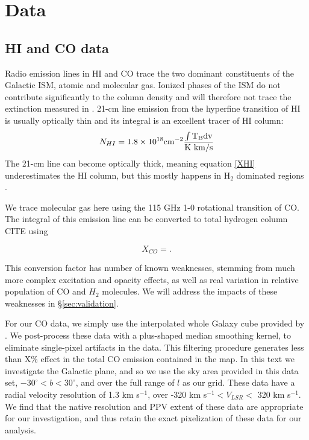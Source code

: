 \section{Data}
\label{sec:data}
\subsection{HI and CO data}

Radio emission lines in HI and CO trace the two dominant constituents of the Galactic ISM, atomic and molecular gas. Ionized phases of the ISM do not contribute significantly to the column density and will therefore not trace the extinction measured in \cite{Green_2015}. 21-cm line emission from the hyperfine transition of HI is usually optically thin and its integral is an excellent tracer of HI column:
\begin{equation}\label{XHI}
N_{HI} = 1.8 \times 10^{18} \rm cm^{-2} \frac{ \int T_B dv}{\rm K~km/s}
\end{equation}
The 21-cm line can become optically thick, meaning equation \ref{XHI} underestimates the HI column, but this mostly happens in H$_2$ dominated regions \cite{Goldsmith_2007}. 

We trace molecular gas here using the 115 GHz 1-0 rotational transition of CO. The integral of this emission line can be converted to total hydrogen column CITE using

\begin{equation}\label{XCO}
X_{CO} = .
\end{equation}

This conversion factor has number of known weaknesses, stemming from much more complex excitation and opacity effects, as well as real variation in relative population of CO and $H_2$ molecules. We will address the impacts of these weaknesses in \S \ref{sec:validation}. 

For our CO data, we simply use the interpolated whole Galaxy cube provided by \cite{Dame_2001}. We post-process these data with a plus-shaped median smoothing kernel, to eliminate single-pixel artifacts in the data. This filtering procedure generates less than X\% effect in the total CO emission contained in the map. In this text we investigate the Galactic plane, and so we use the sky area provided in this data set, $-30^\circ < b < 30^\circ$, and over the full range of $l$ as our grid. These data have a radial velocity resolution of 1.3 km s$^{-1}$, over -320 km s$^{-1} < V_{LSR} <$ 320 km s$^{-1}$. We find that the native resolution and PPV extent of these data are appropriate for our investigation, and thus retain the exact pixelization of these data for our analysis. 

